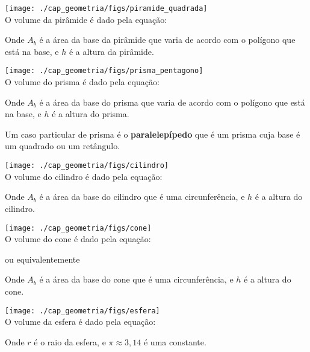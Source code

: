 \begin{multicols}{2}
 \texttt{[image: ./cap\_geometria/figs/piramide\_quadrada]} \\
 O volume da pirâmide é dado pela equação:
 
 
 Onde $A_b$ é a área da base da pirâmide que varia de acordo com o polígono que está na base, e $h$ é a altura da pirâmide.
\end{multicols}

\begin{multicols}{2}
 \texttt{[image: ./cap\_geometria/figs/prisma\_pentagono]} \\
 O volume do prisma é dado pela equação:
 

 Onde $A_b$ é a área da base do prisma que varia de acordo com o polígono que está na base, e $h$ é a altura do prisma.

 Um caso particular de prisma é o \textbf{paralelepípedo} que é um prisma cuja base é um quadrado ou um retângulo.
\end{multicols}

\begin{multicols}{2}
 \texttt{[image: ./cap\_geometria/figs/cilindro]} \\
 O volume do cilindro é dado pela equação:
 

 Onde $A_b$ é a área da base do cilindro que é uma circunferência, e $h$ é a altura do cilindro.
\end{multicols}

\begin{multicols}{2}
 \texttt{[image: ./cap\_geometria/figs/cone]} \\

 O volume do cone é dado pela equação:
 
 ou equivalentemente
 

 Onde $A_b$ é a área da base do cone que é uma circunferência, e $h$ é a altura do cone.
\end{multicols}

\begin{multicols}{2}
 \texttt{[image: ./cap\_geometria/figs/esfera]} \\

 O volume da esfera é dado pela equação:
 
 
 Onde $r$ é o raio da esfera, e $\pi \approx 3,14$ é uma constante.
\end{multicols}
